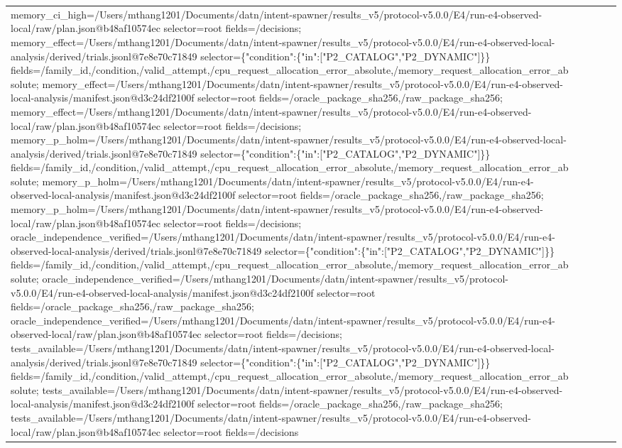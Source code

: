 \begin{tabular}{lllll}
memory\_ci\_high=/Users/mthang1201/Documents/datn/intent-spawner/results\_v5/protocol-v5.0.0/E4/run-e4-observed-local/raw/plan.json@b48af10574ec selector=root fields=/decisions; memory\_effect=/Users/mthang1201/Documents/datn/intent-spawner/results\_v5/protocol-v5.0.0/E4/run-e4-observed-local-analysis/derived/trials.jsonl@7e8e70c71849 selector=\{"condition":\{"in":["P2\_CATALOG","P2\_DYNAMIC"]\}\} fields=/family\_id,/condition,/valid\_attempt,/cpu\_request\_allocation\_error\_absolute,/memory\_request\_allocation\_error\_absolute; memory\_effect=/Users/mthang1201/Documents/datn/intent-spawner/results\_v5/protocol-v5.0.0/E4/run-e4-observed-local-analysis/manifest.json@d3c24df2100f selector=root fields=/oracle\_package\_sha256,/raw\_package\_sha256; memory\_effect=/Users/mthang1201/Documents/datn/intent-spawner/results\_v5/protocol-v5.0.0/E4/run-e4-observed-local/raw/plan.json@b48af10574ec selector=root fields=/decisions; memory\_p\_holm=/Users/mthang1201/Documents/datn/intent-spawner/results\_v5/protocol-v5.0.0/E4/run-e4-observed-local-analysis/derived/trials.jsonl@7e8e70c71849 selector=\{"condition":\{"in":["P2\_CATALOG","P2\_DYNAMIC"]\}\} fields=/family\_id,/condition,/valid\_attempt,/cpu\_request\_allocation\_error\_absolute,/memory\_request\_allocation\_error\_absolute; memory\_p\_holm=/Users/mthang1201/Documents/datn/intent-spawner/results\_v5/protocol-v5.0.0/E4/run-e4-observed-local-analysis/manifest.json@d3c24df2100f selector=root fields=/oracle\_package\_sha256,/raw\_package\_sha256; memory\_p\_holm=/Users/mthang1201/Documents/datn/intent-spawner/results\_v5/protocol-v5.0.0/E4/run-e4-observed-local/raw/plan.json@b48af10574ec selector=root fields=/decisions; oracle\_independence\_verified=/Users/mthang1201/Documents/datn/intent-spawner/results\_v5/protocol-v5.0.0/E4/run-e4-observed-local-analysis/derived/trials.jsonl@7e8e70c71849 selector=\{"condition":\{"in":["P2\_CATALOG","P2\_DYNAMIC"]\}\} fields=/family\_id,/condition,/valid\_attempt,/cpu\_request\_allocation\_error\_absolute,/memory\_request\_allocation\_error\_absolute; oracle\_independence\_verified=/Users/mthang1201/Documents/datn/intent-spawner/results\_v5/protocol-v5.0.0/E4/run-e4-observed-local-analysis/manifest.json@d3c24df2100f selector=root fields=/oracle\_package\_sha256,/raw\_package\_sha256; oracle\_independence\_verified=/Users/mthang1201/Documents/datn/intent-spawner/results\_v5/protocol-v5.0.0/E4/run-e4-observed-local/raw/plan.json@b48af10574ec selector=root fields=/decisions; tests\_available=/Users/mthang1201/Documents/datn/intent-spawner/results\_v5/protocol-v5.0.0/E4/run-e4-observed-local-analysis/derived/trials.jsonl@7e8e70c71849 selector=\{"condition":\{"in":["P2\_CATALOG","P2\_DYNAMIC"]\}\} fields=/family\_id,/condition,/valid\_attempt,/cpu\_request\_allocation\_error\_absolute,/memory\_request\_allocation\_error\_absolute; tests\_available=/Users/mthang1201/Documents/datn/intent-spawner/results\_v5/protocol-v5.0.0/E4/run-e4-observed-local-analysis/manifest.json@d3c24df2100f selector=root fields=/oracle\_package\_sha256,/raw\_package\_sha256; tests\_available=/Users/mthang1201/Documents/datn/intent-spawner/results\_v5/protocol-v5.0.0/E4/run-e4-observed-local/raw/plan.json@b48af10574ec selector=root fields=/decisions \\

\end{tabular}
